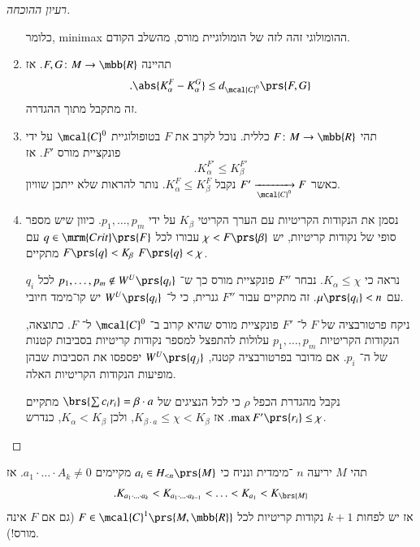 \documentclass[a4paper,10pt,twoside,openany]{book}
\begin{document}
\begin{proof}[רעיון ההוכחה]
\begin{enumerate}
כלומר,
\textenglish{minimax}
ההומולוגי זהה לזה של הומולוגיית מורס, מהשלב הקודם.

\item
תהיינה
$F,G \colon M \to \mbb{R}$.
אז
\[\text{.} \abs{K_\alpha^F - K_\alpha^G} \leq d_{\mcal{C}^0} \prs{F,G}\]
זה מתקבל מתוך ההגדרה.

\item
תהי
$F \colon M \to \mbb{R}$
כללית.
נוכל לקרב את
$F$
בטופולוגיית
$\mcal{C}^0$
על ידי פונקציית מורס
$F'$.
אז
\[\text{.} K_\alpha^{F'} \leq K_\beta^{F'}\]
כאשר
$F' \xrightarrow[\mcal{C}^0]{} F$
נקבל
$K_\alpha^F \leq K_\beta^F$.
נותר להראות שלא ייתכן שוויון.

\item נסמן את הנקודות הקריטיות עם הערך הקריטי
$K_\beta$
על ידי
$p_1, \ldots, p_m$.
כיוון שיש מספר סופי של נקודות קריטיות, יש
$\chi < F\prs{\beta}$
עבורו לכל
$q \in \mrm{Crit}\prs{F}$
עם
$F\prs{q} < K_\beta$
מתקיים
$F\prs{q} < \chi$.

נראה כי
$K_\alpha \leq \chi$.
נבחר
$F''$
פונקציית מורס כך ש־%
$p_1, \ldots, p_m \notin W^U\prs{q_i}$
לכל
$q_i$
עם
$\mu\prs{q_i} < n$.
זה מתקיים עבור
$F''$
גנרית, כי ל־%
$W^U\prs{q_i}$
יש קו־מימד חיובי.

ניקח פרטורבציה של
$F$
ל־%
$F'$
פונקציית מורס שהיא קרוב ב־%
$\mcal{C}^0$
ל־%
$F$.
כתוצאה, הנקודות הקריטיות
$p_1, \ldots, p_m$
עלולות להתפצל למספר נקודות קריטיות בסביבות קטנות של ה־%
$p_i$.
אם מדובר בפרטורבציה קטנה,
$W^U\prs{q_j}$
יפספסו את הסביבות שבהן מופיעות הנקודות הקריטיות האלה.

נקבל מהגדרת הכפל
$\rho$
כי לכל הנציגים של
$\brs{\sum c_i r_i} = \beta \cdot a$
מתקיים
$\max F'\prs{r_i} \leq \chi$.
אז
$K_{\beta \cdot a} \leq \chi < K_\beta$,
ולכן
$K_\alpha < K_\beta$,
כנדרש.
\end{enumerate}
\end{proof}

\begin{corollary}
תהי
$M$
יריעה
$n$%
־מימדית ונניח כי
$a_i \in H_{<n}\prs{M}$
מקיימים
$a_1 \cdot \ldots \cdot A_k \neq 0$.
אז
\begin{align*}
\text{.} K_{a_1 \cdot \ldots \cdot a_k} < K_{a_1 \cdot \ldots \cdot a_{k-1}} < \ldots < K_{a_1} < K_{\brs{M}}
\end{align*}
אז יש לפחות
$k+1$
נקודות קריטיות לכל
$F \in \mcal{C}^1\prs{M,\mbb{R}}$
(גם אם
$F$
אינה מורס!).
\end{corollary}
\end{document}

